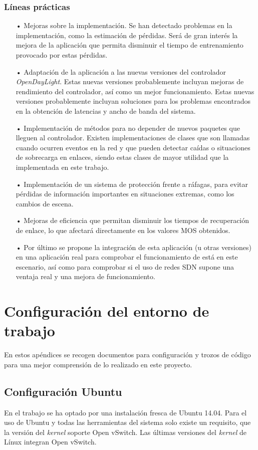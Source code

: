 \documentclass[a4paper,11pt]{book}
\begin{document}
\subsection{Líneas prácticas}
\begin{itemize}
\item[•] Mejoras sobre la implementación. Se han detectado problemas en la implementación, como la estimación de pérdidas. Será de gran interés la mejora de la aplicación que permita disminuir el tiempo de entrenamiento provocado por estas pérdidas.
\item[•] Adaptación de la aplicación a las nuevas versiones del controlador \emph{OpenDayLight}. Estas nuevas versiones probablemente incluyan mejoras de rendimiento del controlador, así como un mejor funcionamiento. Estas nuevas versiones probablemente incluyan soluciones para los problemas encontrados en la obtención de latencias y ancho de banda del sistema.
\item[•] Implementación de métodos para no depender de nuevos paquetes que lleguen al controlador. Existen implementaciones de clases que son llamadas cuando ocurren eventos en la red y que pueden detectar caídas o situaciones de sobrecarga en enlaces, siendo estas clases de mayor utilidad que la implementada en este trabajo.
\item[•] Implementación de un sistema de protección frente a ráfagas, para evitar pérdidas de información importantes en situaciones extremas, como los cambios de escena.
\item[•] Mejoras de eficiencia que permitan disminuir los tiempos de recuperación de enlace, lo que afectará directamente en los valores \ac{MOS} obtenidos.
\item[•] Por último se propone la integración de esta aplicación (u otras versiones) en una aplicación real para comprobar el funcionamiento de está en este escenario, así como para comprobar si el uso de redes \ac{SDN} supone una ventaja real y una mejora de funcionamiento.
\end{itemize}

\appendix
\chapter{Configuración del entorno de trabajo}\label{apeA}
En estos apéndices se recogen documentos para configuración y trozos de código para una mejor comprensión de lo realizado en este proyecto.

\section{Configuración Ubuntu}\label{configUbuntu}
En el trabajo se ha optado por una instalación fresca de Ubuntu 14.04. Para el uso de Ubuntu y todas las herramientas del sistema solo existe un requisito, que la versión del \textit{kernel} soporte Open vSwitch. Las últimas versiones del \textit{kernel} de Línux integran Open vSwitch.
\end{document}
